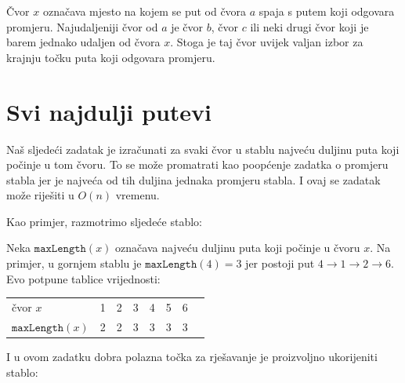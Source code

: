 Čvor $x$ označava mjesto na kojem se put
od čvora $a$ spaja s putem koji odgovara
promjeru.
Najudaljeniji čvor od $a$
je čvor $b$, čvor $c$ ili neki drugi čvor
koji je barem jednako udaljen od čvora $x$.
Stoga je taj čvor uvijek valjan izbor za
krajnju točku puta koji odgovara promjeru.

\section{Svi najdulji putevi}

Naš sljedeći zadatak je izračunati za svaki čvor
u stablu najveću duljinu puta
koji počinje u tom čvoru.
To se može promatrati kao poopćenje
zadatka o promjeru stabla jer je najveća od tih
duljina jednaka promjeru stabla.
I ovaj se zadatak može riješiti u $O(n)$ vremenu.

Kao primjer, razmotrimo sljedeće stablo:
\begin{center}
\end{center}

Neka $\texttt{maxLength}(x)$ označava najveću duljinu
puta koji počinje u čvoru $x$.
Na primjer, u gornjem stablu je
$\texttt{maxLength}(4)=3$ jer postoji
put $4 \rightarrow 1 \rightarrow 2 \rightarrow 6$.
Evo potpune tablice vrijednosti:
\begin{center}
\begin{tabular}{l|lllllll}
čvor $x$ & 1 & 2 & 3 & 4 & 5 & 6 \\
$\texttt{maxLength}(x)$ & 2 & 2 & 3 & 3 & 3 & 3 \\
\end{tabular}
\end{center}

I u ovom zadatku dobra polazna točka
za rješavanje je proizvoljno ukorijeniti stablo:
\begin{center}
\end{center}

